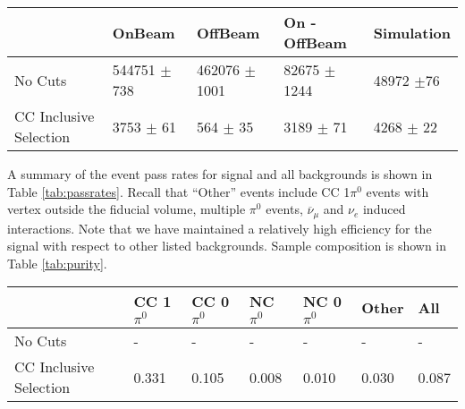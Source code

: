 \begin{table*} 
 \centering
 \begin{tabular}{| l | l | l | l | l |}
  \hline
   & OnBeam & OffBeam & On - OffBeam & Simulation \\ [0.1ex] \hline
No Cuts & 544751 $\pm$ 738 & 462076 $\pm$ 1001 & 82675 $\pm$ 1244 & 48972 $\pm$76 \\ 
CC Inclusive Selection& 3753 $\pm$ 61 & 564 $\pm$ 35 & 3189 $\pm$ 71 & 4268 $\pm$ 22  \\ \hline

\end{tabular}
 \end{table*}

\par A summary of the event pass rates for signal and all backgrounds is shown in Table \ref{tab:passrates}.  Recall that ``Other'' events include CC 1$\pi^0$ events with vertex outside the fiducial volume, multiple $\pi^0$ events, $\overline{\nu}_\mu$ and $\nu_e$ induced interactions.  Note that we have maintained a relatively high efficiency for the signal with respect to other listed backgrounds. Sample composition is shown in Table \ref{tab:purity}. 

\begin{table*}
\centering
{}
 \begin{tabular}{| l | l | l |l|l|l|l|}
 \hline
 & CC 1$\pi^0$ & CC 0$\pi^0$ & NC $\pi^0$ & NC 0$\pi^0$ & Other & All \\ [0.1ex] \hline
No Cuts & - & - & - & - & - & -\\
CC Inclusive Selection& 0.331 & 0.105 & 0.008 & 0.010 & 0.030 & 0.087 \\ \hline
\end{tabular}
\end{table*}


